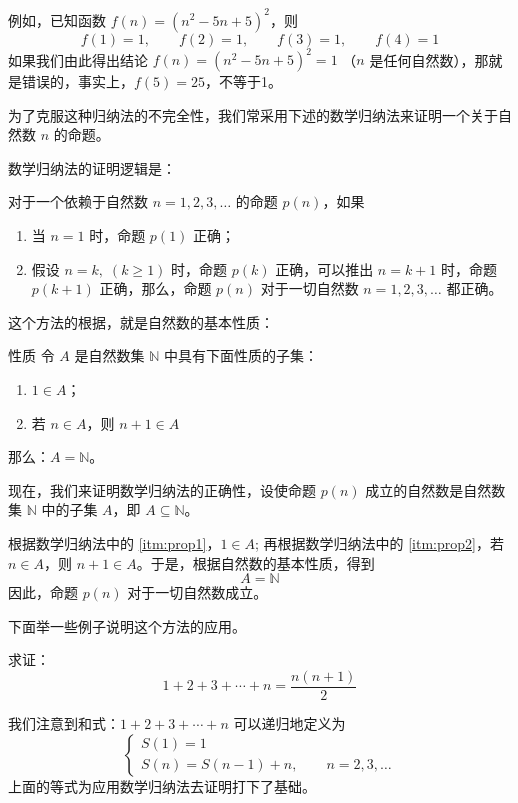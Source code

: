 例如，已知函数 $f(n)=(n^2-5n+5)^2$，则
\[f(1)=1,\qquad f(2)=1,\qquad f(3)=1,\qquad f(4)=1 \]
如果我们由此得出结论 $f(n)=(n^2-5n+5)^2=1$ （$n$ 是任何自然数），那就是错误的，事实上，$f(5)=25$，不等于1。

为了克服这种归纳法的不完全性，我们常采用下述的数学归纳法来证明一个关于自然数 $n$ 的命题。

数学归纳法的证明逻辑是：

对于一个依赖于自然数 $n=1,2,3,\ldots$ 的命题 $p(n)$，如果
\begin{enumerate}
  \item 当 $n=1$ 时，命题 $p(1)$ 正确；
  \item 假设 $n=k,\; (k\geqslant 1)$ 时，命题 $p(k)$ 正确，可以推出 $n=k+1$ 时，命题 $p(k+1)$ 正确，那么，命题 $p(n)$ 对于一切自然数 $n=1,2,3,\ldots$ 都正确。
\end{enumerate}

这个方法的根据，就是自然数的基本性质：

\begin{Theorem}[自然数的基本性质]{性质}
  令 $A$ 是自然数集 $\mathbb{N}$ 中具有下面性质的子集：
\begin{enumerate}
  \item\label{itm:prop1} $1\in A$；
  \item\label{itm:prop2} 若 $n\in A$，则 $n+1\in A$
\end{enumerate}
那么：$A=\mathbb{N}$。
\end{Theorem}

现在，我们来证明数学归纳法的正确性，设使命题 $p(n)$ 成立的自然数是自然数集 $\mathbb{N}$ 中的子集 $A$，即 $A\subseteq \mathbb{N}$。

根据数学归纳法中的 \ref{itm:prop1}，$1\in A$; 再根据数学归纳法中的 \ref{itm:prop2}，若 $n\in A$，则 $n+1\in A$。于是，根据自然数的基本性质，得到
\[A=\mathbb{N}\]
因此，命题 $p(n)$ 对于一切自然数成立。

下面举一些例子说明这个方法的应用。

\begin{example}
  求证：
  \begin{equation}
    \label{eq:sum_n}
    1+2+3+\cdots+n=\frac{n(n+1)}{2}
  \end{equation}
\end{example}

\begin{analyze}
    我们注意到和式：$1+2+3+\cdots+n$ 可以递归地定义为
\[\begin{cases}
    S(1)=1\\
    S(n)=S(n-1)+n,\qquad n=2,3,\ldots
\end{cases}\]
上面的等式为应用数学归纳法去证明打下了基础。
\end{analyze}

